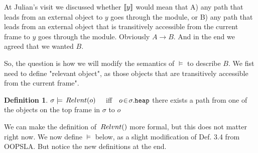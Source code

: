 \documentclass[11pt]{article} %
\theoremstyle{definition}
\newtheorem{definition}{Definition}[section]
\begin{document}
At Julian's visit we discussed whether $\llbracket y \rrbracket$ 
would mean that 
A) any path that leads from an external object   to $y$ goes through the module, or 
B)  any path that leads from an external object that is transitively accessible from the current frame  to $y$ goes through the module. Obviously $A \rightarrow B$. And in the end we agreed that we wanted $B$.

So, the question is how we will modify the semantics of $\models$ to describe $B$.
We fist need to define "relevant object", as those objects  that are transitively accessible from the current frame". 



\begin{definition}
$\sigma \models \,Relvnt(o)$ \ \ iff\ \ $o\!\in\!\sigma.{\texttt{heap}}$ there exists a path from one of the objects on the top frame in $\sigma$ to $o$
\end{definition}

We can make the definition of $\Relevant$ more formal, but this does not matter right now.
We now define $\models$ below, as a slight modification of   Def. 3.4 from OOPSLA. But notice the new definitions at the end.
\end{document}
